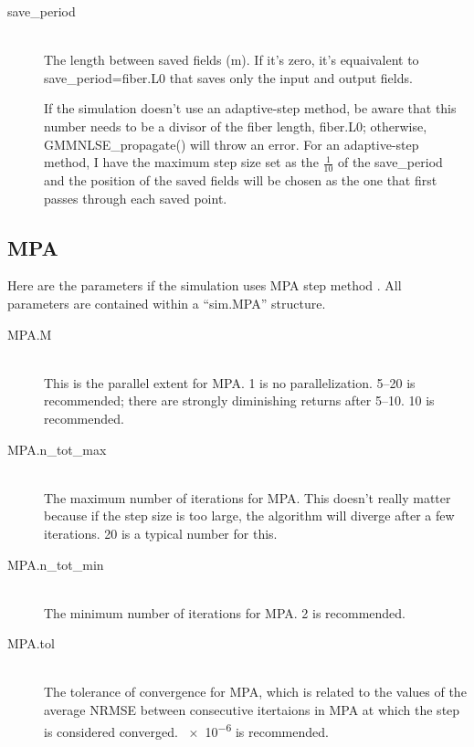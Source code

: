 \documentclass[12pt,hidelinks]{book}
\begin{document}
\begin{description}
\item[\color{blue}save\_period]\mbox{}\\
The length between saved fields (\si{\m}). If it's zero, it's equaivalent to save\_period=fiber.L0 that saves only the input and output fields.

If the simulation doesn't use an adaptive-step method, be aware that this number needs to be a divisor of the fiber length, fiber.L0; otherwise, GMMNLSE\_propagate() will throw an error. For an adaptive-step method, I have the maximum step size set as the $\frac{1}{10}$ of the save\_period and the position of the saved fields will be chosen as the one that first passes through each saved point.
\end{description}

\subsection{MPA}
Here are the parameters if the simulation uses MPA step method \cite{Wright2018}. All parameters are contained within a ``sim.MPA'' structure.

\begin{description}
\item[MPA.M]\mbox{}\\
This is the parallel extent for MPA. \num{1} is no parallelization. \numrange[range-phrase=--]{5}{20} is recommended; there are strongly diminishing returns after \numrange[range-phrase=--]{5}{10}. \num{10} is recommended.

\item[MPA.n\_tot\_max]\mbox{}\\
The maximum number of iterations for MPA. This doesn't really matter because if the step size is too large, the algorithm will diverge after a few iterations. \num{20} is a typical number for this.

\item[MPA.n\_tot\_min]\mbox{}\\
The minimum number of iterations for MPA. \num{2} is recommended.

\item[MPA.tol]\mbox{}\\
The tolerance of convergence for MPA, which is related to the values of the average NRMSE between consecutive itertaions in MPA at which the step is considered converged. \num{e-6} is recommended.
\end{description}
\end{document}
